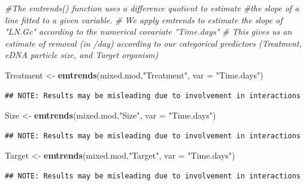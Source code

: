 \documentclass[
]{article}
\newenvironment{Shaded}{\begin{snugshade}}{\end{snugshade}}
\newcommand{\AttributeTok}[1]{\textcolor[rgb]{0.13,0.29,0.53}{#1}}
\newcommand{\CommentTok}[1]{\textcolor[rgb]{0.56,0.35,0.01}{\textit{#1}}}
\newcommand{\FunctionTok}[1]{\textcolor[rgb]{0.13,0.29,0.53}{\textbf{#1}}}
\newcommand{\NormalTok}[1]{#1}
\newcommand{\OtherTok}[1]{\textcolor[rgb]{0.56,0.35,0.01}{#1}}
\newcommand{\StringTok}[1]{\textcolor[rgb]{0.31,0.60,0.02}{#1}}
\begin{document}
\begin{Shaded}
\begin{Highlighting}[]
\CommentTok{\#The emtrends() function uses a difference quotient to estimate }
\CommentTok{\#the slope of a line fitted to a given variable.}
\CommentTok{\# We apply emtrends to estimate the slope of "LN.Gc" according to the numerical covariate "Time.days"}
\CommentTok{\# This gives us an estimate of removal (in /day) according to our categorical predictors (Treatment, eDNA particle size, and Target organism)}

\NormalTok{Treatment }\OtherTok{\textless{}{-}} \FunctionTok{emtrends}\NormalTok{(mixed.mod,}\StringTok{"Treatment"}\NormalTok{, }\AttributeTok{var =} \StringTok{"Time.days"}\NormalTok{) }
\end{Highlighting}
\end{Shaded}

\begin{verbatim}
## NOTE: Results may be misleading due to involvement in interactions
\end{verbatim}

\begin{Shaded}
\begin{Highlighting}[]
\NormalTok{Size }\OtherTok{\textless{}{-}} \FunctionTok{emtrends}\NormalTok{(mixed.mod,}\StringTok{"Size"}\NormalTok{, }\AttributeTok{var =} \StringTok{"Time.days"}\NormalTok{) }
\end{Highlighting}
\end{Shaded}

\begin{verbatim}
## NOTE: Results may be misleading due to involvement in interactions
\end{verbatim}

\begin{Shaded}
\begin{Highlighting}[]
\NormalTok{Target }\OtherTok{\textless{}{-}} \FunctionTok{emtrends}\NormalTok{(mixed.mod,}\StringTok{"Target"}\NormalTok{, }\AttributeTok{var =} \StringTok{"Time.days"}\NormalTok{)}
\end{Highlighting}
\end{Shaded}

\begin{verbatim}
## NOTE: Results may be misleading due to involvement in interactions
\end{verbatim}
\end{document}
